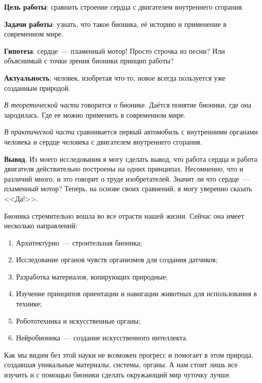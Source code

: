 \bigskip
{}



\makeProcTitleSchool



\textbf{Цель работы}: сравнить строение сердца с двигателем внутреннего сгорания.

\textbf{Задачи работы}: узнать, что такое бионика, её историю и применение в современном мире.

\textbf{Гипотеза}: сердце~--- пламенный мотор! Просто строчка из песни? Или объяснимый с точки зрения бионики принцип работы?

\textbf{Актуальность}: человек, изобретая что-то, новое всегда пользуется уже созданным природой.

\textit{В теоретической части} говорится о бионике. Даётся понятие бионики, где она зародилась. Где ее можно применить в современном  мире.

\textit{В практической части} сравнивается первый автомобиль с внутренними органами человека и сердце человека с двигателем внутреннего сгорания.

\textbf{Вывод}. Из моего исследования я могу сделать вывод, что работа сердца и работа двигателя действительно построены на одних принципах. Несомненно, что и различий много, и это говорит о труде изобретателей. Значит ли что сердце~--- пламенный мотор? Теперь, на основе своих сравнений, я могу уверенно сказать <<Да!>>.

Бионика стремительно вошла во все отрасти нашей жизни. Сейчас она имеет несколько направлений:
\begin{enumerate}[noitemsep]\vspace{-8pt}
\item Архитектурно~--- строительная бионика;
\item Исследование органов чувств организмов для создания датчиков;
\item Разработка материалов, копирующих природные;
\item Изучение принципов ориентации и навигации животных для использования в технике;
\item Робототехника и искусственные органы;
\item Нейробионика~--- создание искусственного интеллекта.
\end{enumerate}\vspace{-8pt}

Как мы видим без этой науки не возможен прогресс и помогает в этом природа, создавшая уникальные материалы, системы, органы. А нам стоит лишь все изучить и с помощью бионики сделать окружающий мир чуточку лучше.
